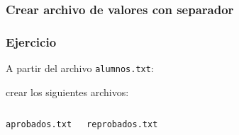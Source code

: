 \documentclass[12pt]{beamer}
\begin{document}
  \begin{frame}
    \label{crear-archivo-csv}
    \frametitle{Crear archivo de valores con separador}
    
  \end{frame}

  \begin{frame}
    \label{ejercicio-archivos-csv}
    \frametitle{Ejercicio}
    A partir del archivo \texttt{alumnos.txt}:
    
    \vspace{1ex}
    crear los siguientes archivos:
    \vspace{1ex}
    \begin{columns}[T]
        \texttt{aprobados.txt}
        
        \texttt{reprobados.txt}
        
    \end{columns}
  \end{frame}
\end{document}
